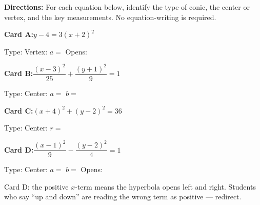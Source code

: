 \documentclass[10pt]{article}
\begin{document}
\namepartnerperiod

\vspace{0.10in}

\begin{tcolorbox}[colback=white, colframe=black!40,
    title=\textbf{Tier R --- Remediate},
    fonttitle=\bfseries, arc=2mm, left=3mm, right=3mm, top=2mm, bottom=2mm]

\textbf{Directions:} For each equation below, identify the type of conic,
the center or vertex, and the key measurements. No equation-writing is required.

\vspace{6pt}
\textbf{Card A:}\quad $y - 4 = 3(x + 2)^2$

Type:  \quad Vertex:  \quad $a =$  \quad Opens: 

\vspace{10pt}
\textbf{Card B:}\quad $\dfrac{(x-3)^2}{25} + \dfrac{(y+1)^2}{9} = 1$

Type:  \quad Center:  \quad $a =$  \quad $b =$ 

\vspace{10pt}
\textbf{Card C:}\quad $(x+4)^2 + (y-2)^2 = 36$

Type:  \quad Center:  \quad $r =$ 

\vspace{10pt}
\textbf{Card D:}\quad $\dfrac{(x-1)^2}{9} - \dfrac{(y-2)^2}{4} = 1$

Type:  \quad Center:  \quad $a =$  \quad $b =$  \quad Opens: 

\end{tcolorbox}

\begin{teachernote}
Card D: the positive $x$-term means the hyperbola opens left and right.
Students who say ``up and down'' are reading the wrong term as positive --- redirect.
\end{teachernote}

\vspace{0.10in}
\end{document}
